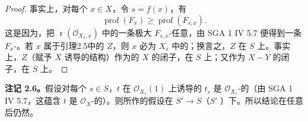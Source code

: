 \begin{proof}
事实上，对每个 $x\in X$，令 $s=f(x)$，有
\[
 \operatorname{prof}(F_x)\geq\operatorname{prof}(F_{s,x}).\tag{16}
\]
这是因为，把 $\operatorname r(\mathcal O_{X_s,x})$ 中的一条极大 $F_{s,x}$-任意，由 SGA 1 IV 5.7 便得到一条 $F_x$-。若 $x$ 属于引理2.5中的 $Z$，则 $x$ 必为 $X_s$ 中的；换言之，$Z$ 在 $S$ 上。事实上，$Z$（赋予 $X$ 诱导的结构）作为的 $X$ 的闭子，在 $S$ 上；又作为 $X-Y$ 的闭子，在 $S$ 上。
\end{proof}
\textbf{注记 2.6。}假设对每个 $s\in S$，$t$ 在 $\mathcal O_{X_s}(1)$ 上诱导的 $t_s$ 是 $\mathcal O_{X_s}$-的（由 SGA 1 IV 5.7，这蕴含 $t$ 是 $\mathcal O_X$-的）。则所作的假设在 $S'\to S$（$S'$ ）下。所以结论在任意后仍然。

